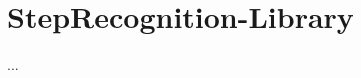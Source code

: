 \documentclass[../entwurf.tex]{subfiles}
\begin{document}
\section{StepRecognition-Library}
...
\end{document}
